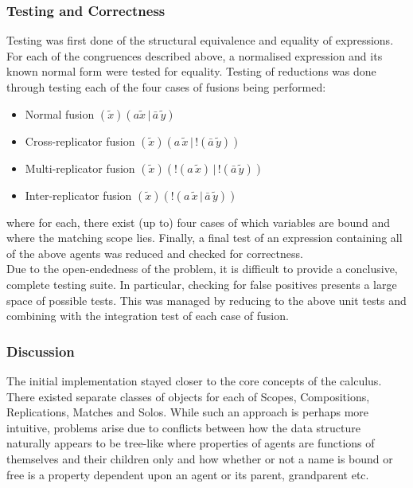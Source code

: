     \subsubsection{Testing and Correctness}
        Testing was first done of the structural equivalence and equality of expressions.
        For each of the congruences described above, a normalised expression and its known normal form were tested for equality.
        Testing of reductions was done through testing each of the four cases of fusions being performed:
        \begin{itemize}
            \item Normal fusion $(\tilde{x})(a \tilde{x} \,|\, \bar{a} \, \tilde{y})$
            \item Cross-replicator fusion $(\tilde{x})(a \, \tilde{x} \,|\, !(\bar{a} \, \tilde{y}))$
            \item Multi-replicator fusion $(\tilde{x})(!(a \, \tilde{x}) \,|\, !(\bar{a} \, \tilde{y}))$
            \item Inter-replicator fusion $(\tilde{x})(!(a \, \tilde{x} \,|\, \bar{a} \, \tilde{y}))$
        \end{itemize} 
        where for each, there exist (up to) four cases of which variables are bound and where the matching scope lies.
        Finally, a final test of an expression containing all of the above agents was reduced and checked for correctness. \\

        Due to the open-endedness of the problem, it is difficult to provide a conclusive, complete testing suite.
        In particular, checking for false positives presents a large space of possible tests.
        This was managed by reducing to the above unit tests and combining with the integration test of each case of fusion.


    \subsubsection{Discussion}
        The initial implementation stayed closer to the core concepts of the calculus.
        There existed separate classes of objects for each of Scopes, Compositions, Replications, Matches and Solos.
        While such an approach is perhaps more intuitive, problems arise due to conflicts between how the data structure naturally appears to be tree-like where properties of agents are functions of themselves and their children only and how whether or not a name is bound or free is a property dependent upon an agent or its parent, grandparent etc.

